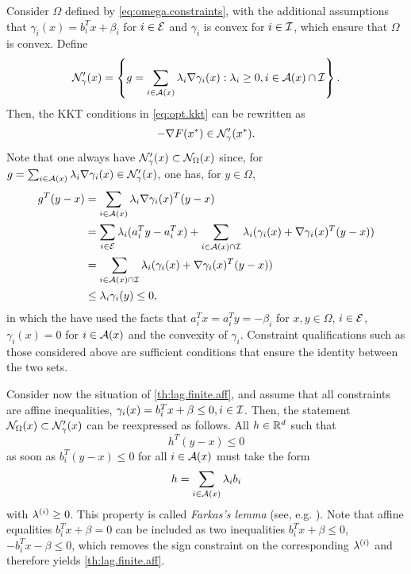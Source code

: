 Consider $\Omega$ defined by \cref{eq:omega.constraints}, with the additional assumptions that $\gamma_i(x) = b_i^T x + \beta_i$ for $i\in {\mathcal E}$ and $\gamma_i$ is convex for $i\in {\mathcal I}$, which ensure that $\Omega$ is convex. 
Define
\[
{\mathcal N}'_\gamma(x) = \left\{g = \sum_{i\in {\mathcal A}(x)} \lambda_i \nabla \gamma_i(x): \lambda_i \geq 0, i\in {\mathcal A}(x) \cap {\mathcal I}\right \}.
\]
Then, the KKT conditions in \cref{eq:opt.kkt} can be rewritten as 
\[
- \nabla F(x^*) \in {\mathcal N}'_\gamma(x^*).
\]
Note that one always have ${\mathcal N}'_\gamma(x) \subset {\mathcal N}_\Omega(x)$ since, for $g =  \sum_{i\in {\mathcal A}(x)} \lambda_i \nabla \gamma_i(x)\in {\mathcal N}'_\gamma(x)$, one has, for $y\in \Omega$,
\begin{align*}
g^T (y-x) &= \sum_{i\in {\mathcal A}(x)} \lambda_i \nabla \gamma_i(x)^T(y-x)\\
&= \sum_{i\in {\mathcal E}} \lambda_i (a_i^T y - a_i^Tx) + \sum_{i\in {\mathcal A}(x)\cap{\mathcal I}} \lambda_i(\gamma_i(x) + \nabla \gamma_i(x)^T(y-x))\\
& =  \sum_{i\in {\mathcal A}(x)\cap{\mathcal I}} \lambda_i(\gamma_i(x) + \nabla \gamma_i(x)^T(y-x))\\
&\leq \lambda_i \gamma_i(y) \leq 0,
\end{align*}
in which the have used the facts that $a_i^Tx = a_i^T y = -\beta_i$ for $x,y\in\Omega$, $i\in {\mathcal E}$, $\gamma_i(x) = 0$ for $i\in{\mathcal A}(x)$ and the convexity of $\gamma_i$. Constraint qualifications such as those considered above are sufficient conditions that ensure the identity between the two sets. 




Consider now the situation of \cref{th:lag.finite.aff}, and assume that  all constraints are affine inequalities, $\gamma_i(x) = b_i^T x + \beta \leq 0, i\in {\mathcal I}$. Then, the statement 
${\mathcal N}_\Omega(x) \subset {\mathcal N}'_\gamma(x)$ can be reexpressed as follows. All $h \in {\mathbb{R}}^d$ such that
\[
h^T(y-x) \leq 0
\]
as soon as $b_i^T(y-x)\leq 0$ for all $i\in {\mathcal A}(x)$ must take the form
\[
h = \sum_{i\in{\mathcal A}(x)} \lambda_i b_i
\]
with $\lambda^{(i)} \geq 0$. This property is called  {\em Farkas's lemma} (see, e.g. \citep{rockafellar1970convex}). Note that affine equalities $b_i^T x + \beta=0$ can be included as two inequalities $b_i^T x + \beta\leq 0$, $-b_i^T x - \beta\leq 0$, which removes the sign constraint on the corresponding $\lambda^{(i)}$ and therefore yields
\cref{th:lag.finite.aff}. 

% 
%


